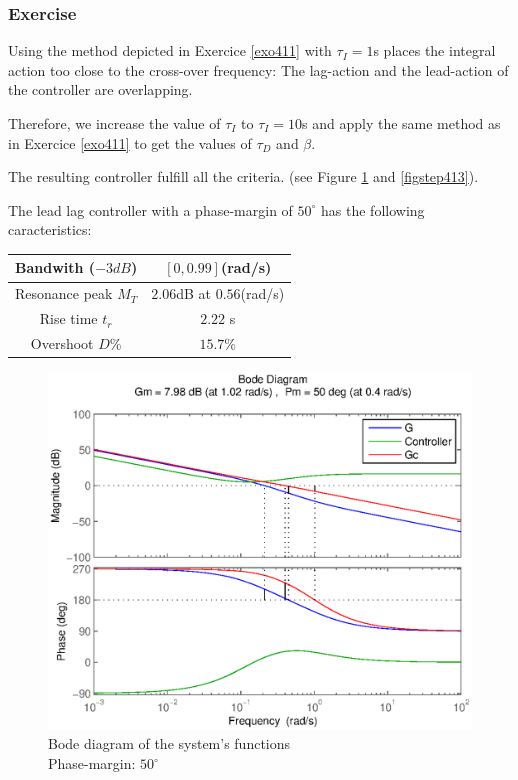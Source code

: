 \subsubsection{Exercise}

Using the method depicted in Exercice \ref{exo411} with $\tau_I = 1$s places the integral action too close to the cross-over frequency: The lag-action and the lead-action of the controller are overlapping.

Therefore, we increase the value of $\tau_I$ to $\tau_I = 10$s and apply the same method as in Exercice \ref{exo411} to get the values of $\tau_D$ and $\beta$.

The resulting controller fulfill all the criteria. (see Figure \ref{figbode413} and \ref{figstep413}).

The lead lag controller with a phase-margin of $50^{\circ}$ has the following caracteristics:
\begin{center}
\begin{tabular}{|c|c|}
    \hline
    Bandwith ($-3dB$) & $[0,0.99]$(rad/s)\\
    \hline
    Resonance peak $M_T$ & $2.06$dB at $0.56$(rad/s)\\
    \hline
    Rise time $t_r$ & $2.22$ s\\
    \hline
    Overshoot $D$\% & $15.7$\%\\
    \hline
\end{tabular}
\end{center}

\begin{figure}[h!t]
   \includegraphics[width=\columnwidth]{fig/bode413.eps}
    \caption{Bode diagram of the system's functions \\ Phase-margin: $50^{\circ}$} 
    \label{figbode413}
\end{figure}

